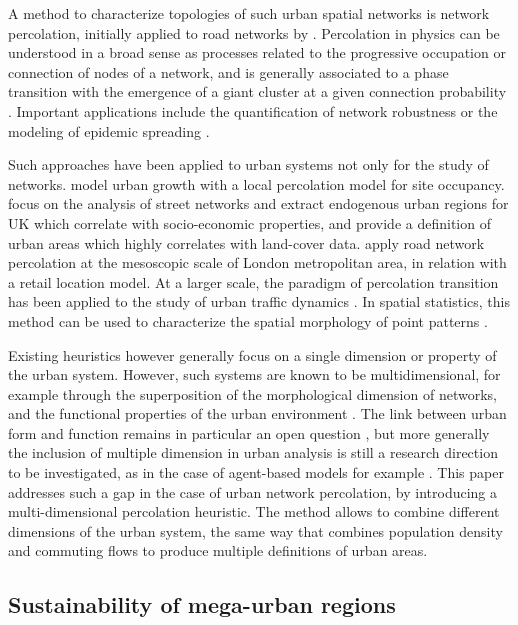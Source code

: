 \documentclass{jimis-en}
\begin{document}
A method to characterize topologies of such urban spatial networks is network percolation, initially applied to road networks by \cite{arcaute2016cities}. Percolation in physics can be understood in a broad sense as processes related to the progressive occupation or connection of nodes of a network, and is generally associated to a phase transition with the emergence of a giant cluster at a given connection probability \citep{stauffer2014introduction}. Important applications include the quantification of network robustness \citep{callaway2000network} or the modeling of epidemic spreading \citep{newman1999scaling}.

Such approaches have been applied to urban systems not only for the study of networks. \cite{makse1998modeling} model urban growth with a local percolation model for site occupancy. \cite{arcaute2016cities} focus on the analysis of street networks and extract endogenous urban regions for UK which correlate with socio-economic properties, and provide a definition of urban areas which highly correlates with land-cover data. \cite{piovani2017urban} apply road network percolation at the mesoscopic scale of London metropolitan area, in relation with a retail location model. At a larger scale, the paradigm of percolation transition has been applied to the study of urban traffic dynamics \citep{Li669,Zeng23}. In spatial statistics, this method can be used to characterize the spatial morphology of point patterns \citep{huynh2018characterisation}.


Existing heuristics however generally focus on a single dimension or property of the urban system. However, such systems are known to be multidimensional, for example through the superposition of the morphological dimension of networks, and the functional properties of the urban environment \citep{burger2012form}. The link between urban form and function remains in particular an open question \citep{batty1994fractal}, but more generally the inclusion of multiple dimension in urban analysis is still a research direction to be investigated, as in the case of agent-based models for example \citep{perez2016agent}. This paper addresses such a gap in the case of urban network percolation, by introducing a multi-dimensional percolation heuristic. The method allows to combine different dimensions of the urban system, the same way that \cite{cottineau2018defining} combines population density and commuting flows to produce multiple definitions of urban areas.


\subsection{Sustainability of mega-urban regions}
\end{document}
